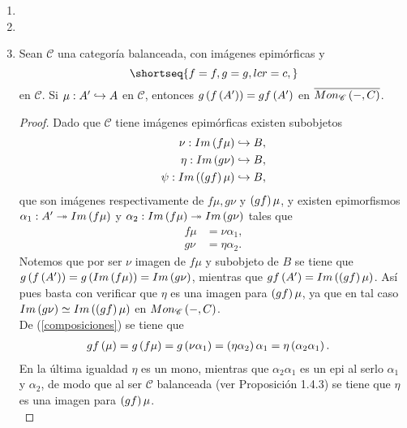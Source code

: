 \documentclass{article}
\begin{document}
\begin{enumerate}[label=\textbf{Ej \arabic*.}]
\begin{proof}
		\end{proof}
		\item 
		\item
		\item Sean $\mathscr{C}$ una categoría balanceada, con imágenes epimórficas y \begin{equation*}
			\shortseq{f=f,g=g,lcr=c,}
		\end{equation*} en $\mathscr{C}$. Si $\catarrow{\mu}{A'}{A}{m}$ en $\mathscr{C}$, entonces  $g\left(f\left(A'\right)\right)=gf\left(A'\right)$ en $\overline{Mon_{\mathscr{C}}\left(-,C\right)}$.
		\begin{proof}
			Dado que $\mathscr{C}$ tiene imágenes epimórficas existen subobjetos
			\begin{align*}
				\catarrow{\nu}{Im\lrprth{f\mu}}{B}{m},\\
				\catarrow{\eta}{Im\lrprth{g\nu}}{B}{m},\\
				\catarrow{\psi}{Im\lrprth{\lrprth{gf}\mu}}{B}{m},				
			\end{align*} 
			que son imágenes respectivamente de $f\mu, g\nu$ y $\left(gf\right)\mu$,
			y existen epimorfismos $\catarrow{\alpha_1}{A'}{Im\lrprth{f\mu}}{e}$ y $\catarrow{\alpha_2}{Im\lrprth{f\mu}}{Im\lrprth{g\nu}}{e}$ tales que
			\begin{equation*}\tag{*}\label{composiciones}
				\begin{split}
					f\mu&=\nu\alpha_1,\\
				g\nu&=\eta\alpha_2.
				\end{split}
			\end{equation*}
			Notemos que por ser $\nu$ imagen de $f\mu$ y subobjeto de $B$ se tiene que $g\left(f\left(A'\right)\right)=g\left(Im\left(f\mu\right)\right)=Im\left(g\nu\right)$, mientras que $gf\left(A'\right)=Im\left(\left(gf\right)\mu\right)$. Así pues basta con verificar que $\eta$ es una imagen para $\left(gf\right)\mu$, ya que en tal caso $Im\left(g\nu\right)\simeq Im\left(\left(gf\right)\mu\right)$ en $Mon_{\mathscr{C}}\left(-,C\right)$.\\
			De (\ref{composiciones}) se tiene que 
			\begin{align*}
				gf\left(\mu\right)&=g\left(f\mu\right)=g\left(\nu\alpha_1\right)=\left(\eta\alpha_2\right)\alpha_1=\eta\left(\alpha_2\alpha_1\right).
			\end{align*}
			En la última igualdad $\eta$ es un mono, mientras que $\alpha_2\alpha_1$ es un epi al serlo $\alpha_1$ y $\alpha_2$, de modo que al ser $\mathscr{C}$ balanceada (ver Proposición 1.4.3) se tiene que $\eta$ es una imagen para $\left(gf\right)\mu$.\\

\end{proof}
\end{enumerate}
\end{document}
